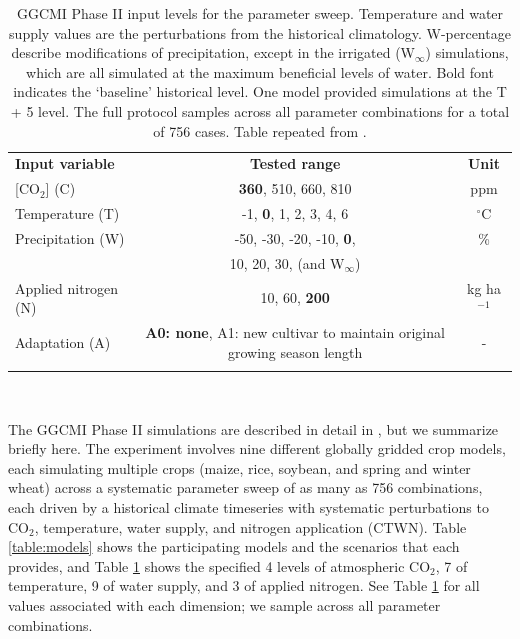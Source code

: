 \documentclass[gmd, manuscript]{copernicus} %
\begin{document}
\begin{table}[ht]
    \caption{
    GGCMI Phase II input levels for the parameter sweep. 
    Temperature and water supply values are the perturbations from the historical climatology. 
    W-percentage describe modifications of precipitation, except in the irrigated (W$_{\infty}$) simulations, which are all simulated at the maximum beneficial levels of water. 
    Bold font indicates the `baseline' historical level. 
    One model provided simulations at the T + 5 level. 
    The full protocol samples across all parameter combinations for a total of 756 cases.
    Table repeated from \citet{franke2019ctwnexperiment}.
    }
    \label{table:inputs} 
    \begin{tabular}{lcc} 
        \tophline \vspace{1mm}
        \textbf{Input variable} & \textbf{Tested range} & \textbf{Unit} \\ \middlehline \vspace{1mm}
        [CO$_2$] (C) & \textbf{360}, 510, 660, 810 & ppm\\ \middlehline \vspace{1mm}
        Temperature (T) & -1, \textbf{0}, 1, 2, 3, 4, 6 & $^{\circ}$C\\ \middlehline \vspace{1mm}
        Precipitation (W) & -50, -30, -20, -10, \textbf{0}, & \% \\
        {} & 10, 20, 30, (and W$_{\infty}$) & {} \\ \middlehline \vspace{1mm}
        Applied nitrogen (N) & 10, 60, \textbf{200} & kg ha$^{-1}$ \\ \middlehline \vspace{1mm}
        Adaptation (A) & \textbf{A0: none}, A1: new cultivar to maintain original growing season length & -\\ \bottomhline
    \end{tabular}\\
\end{table}

The GGCMI Phase II simulations are described in detail in \citet{franke2019ctwnexperiment}, but we summarize briefly here. 
The experiment involves nine different globally gridded crop models, each simulating multiple crops (maize, rice, soybean, and spring and winter wheat) across a systematic parameter sweep of as many as 756 combinations, each driven by a historical climate timeseries with systematic perturbations to CO$_2$, temperature, water supply, and nitrogen application (CTWN). 
Table \ref{table:models} shows the participating models and the scenarios that each provides, and Table \ref{table:inputs} shows the specified 4 levels of atmospheric CO$_2$, 7 of temperature, 9 of water supply, and 3 of applied nitrogen. 
See Table \ref{table:inputs} for all values associated with each dimension; we sample across all parameter combinations.
\end{document}
